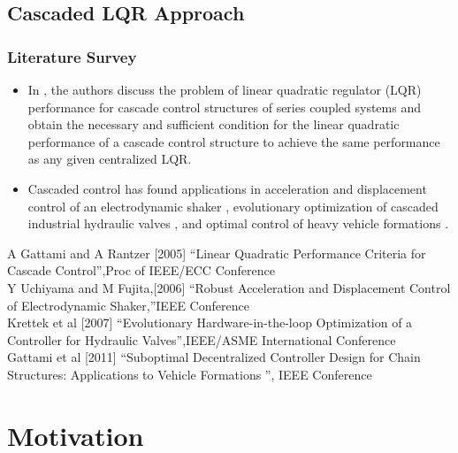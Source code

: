 \documentclass[10pt]{beamer}
\begin{document}
\subsection{Cascaded LQR Approach}
\begin{frame}
\frametitle{Literature Survey}
\begin{itemize}
 \item In \cite{gattami2005}, the authors discuss the problem of linear quadratic regulator (LQR) performance for cascade control structures of series coupled systems and obtain the necessary and sufficient condition for the linear quadratic performance of a cascade control structure to achieve the same performance as any given centralized LQR. \bigskip
\item Cascaded control has found applications in acceleration and displacement control of an electrodynamic shaker \cite{fujita2006}, evolutionary optimization of cascaded industrial hydraulic valves \cite{hoffman2007}, and optimal control of heavy vehicle formations \cite{gattami2011}. \bigskip
\end{itemize}
\vspace{.5cm}
\footnoterule
\tiny {\cite{gattami2005} A Gattami and A Rantzer [2005] ``Linear Quadratic Performance Criteria for Cascade Control'',Proc of IEEE/ECC Conference} \\
\tiny {\cite{fujita2006} Y Uchiyama and M Fujita,[2006] ``Robust Acceleration and Displacement Control of Electrodynamic Shaker,''IEEE Conference}\\
\tiny {\cite{hoffman2007} Krettek et al [2007] ``Evolutionary Hardware-in-the-loop Optimization of a Controller for Hydraulic Valves'',IEEE/ASME International Conference} \\
\tiny {\cite{gattami2011} Gattami et al [2011] ``Suboptimal Decentralized Controller Design for Chain Structures: Applications to Vehicle Formations '', IEEE Conference}
\end{frame}
\section{ Motivation}
\end{document}
